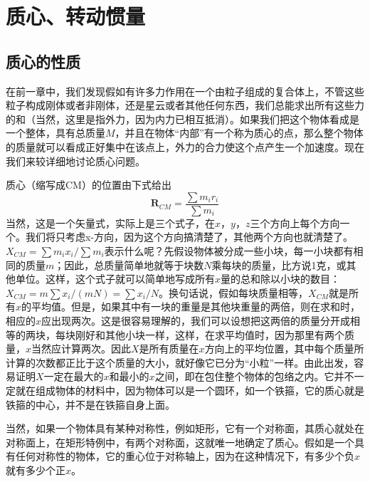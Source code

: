 \chapter{质心、转动惯量}

\section{质心的性质}

在前一章中，我们发现假如有许多力作用在一个由粒子组成的复合体上，不管这些粒子构成刚体或者非刚体，还是星云或者其他任何东西，我们总能求出所有这些力的和（当然，这里是指外力，因为内力已相互抵消）。如果我们把这个物体看成是一个整体，具有总质量$M$，并且在物体“内部”有一个称为质心的点，那么整个物体的质量就可以看成正好集中在该点上，外力的合力使这个点产生一个加速度。现在我们来较详细地讨论质心问题。

质心（缩写成CM）的位置由下式给出
\begin{equation}
    \label{Eq:I:19:1}
    \boldsymbol{R}_{CM} = \frac{\sum m_ir_i}{\sum m_i}
\end{equation}
当然，这是一个矢量式，实际上是三个式子，在$x$，$y$，$z$三个方向上每个方向一个。我们将只考虑x-方向，因为这个方向搞清楚了，其他两个方向也就清楚了。$X_{CM}=\sum m_ix_i/\sum m_i$表示什么呢？先假设物体被分成一些小块，每一小块都有相同的质量$m$；因此，总质量简单地就等于块数$N$乘每块的质量，比方说1克，或其他单位。这样，这个式子就可以简单地写成所有$x$量的总和除以小块的数目：$X_{CM}=m\sum x_i/(mN)=\sum x_i/N$。换句话说，假如每块质量相等，$X_{CM}$就是所有$x$的平均值。但是，如果其中有一块的重量是其他块重量的两倍，则在求和时，相应的$x$应出现两次。这是很容易理解的，我们可以设想把这两倍的质量分开成相等的两块，每块刚好和其他小块一样，这样，在求平均值时，因为那里有两个质量，$x$当然应计算两次。因此$X$是所有质量在$x$方向上的平均位置，其中每个质量所计算的次数都正比于这个质量的大小，就好像它已分为“小粒”一样。由此出发，容易证明$X$一定在最大的$x$和最小的$x$之间，即在包住整个物体的包络之内。它并不一定就在组成物体的材料中，因为物体可以是一个圆环，如一个铁箍，它的质心就是铁箍的中心，并不是在铁箍自身上面。

当然，如果一个物体具有某种对称性，例如矩形，它有一个对称面，其质心就处在对称面上，在矩形特例中，有两个对称面，这就唯一地确定了质心。假如是一个具有任何对称性的物体，它的重心位于对称轴上，因为在这种情况下，有多少个负$x$就有多少个正$x$。

